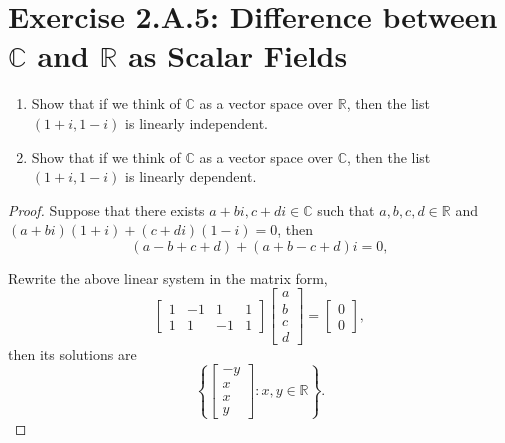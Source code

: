 \section{Exercise 2.A.5: Difference between $\mathbb{C}$ and $\mathbb{R}$ as Scalar Fields}
\begin{enumerate}[label=(\alph*)]
\item Show that if we think of $\mathbb{C}$ as a vector space over $\mathbb{R}$, then the list $(1+i,1-i)$ is linearly independent.
\item Show that if we think of $\mathbb{C}$ as a vector space over $\mathbb{C}$, then the list $(1+i,1-i)$ is linearly dependent.
\end{enumerate}
\begin{proof}
Suppose that there exists $a+bi, c+di\in\mathbb{C}$ such that $a,b,c,d\in\mathbb{R}$ and $(a+bi)(1+i)+(c+di)(1-i)=0$, then
\[
(a-b+c+d)+(a+b-c+d)i=0,
\]

Rewrite the above linear system in the matrix form,
\[
\begin{bmatrix}
1&-1&1&1\\
1&1&-1&1
\end{bmatrix}
\begin{bmatrix}
a\\
b\\
c\\
d
\end{bmatrix}
=
\begin{bmatrix}
0\\
0
\end{bmatrix},
\]
then its solutions are
\[
\left\{\begin{bmatrix}-y\\x\\x\\y\end{bmatrix}:x,y\in\mathbb{R}\right\}.
\]


\end{proof}
